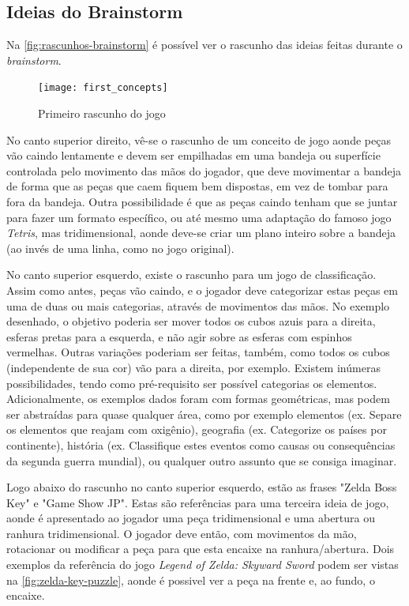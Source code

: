 \subsection{Ideias do Brainstorm}\label{subsec-ideias-brainstorm}

Na \autoref{fig:rascunhos-brainstorm} é possível ver o rascunho das ideias feitas durante o \textit{brainstorm}. 

\begin{figure}[h]
	\centering
	\caption{Primeiro rascunho do jogo}
	\texttt{[image: first\_concepts]}
	\legend{\fonteAP}
	\label{fig:rascunhos-brainstorm}
\end{figure}

No canto superior direito, vê-se o rascunho de um conceito de jogo aonde 
peças vão caindo lentamente e devem ser empilhadas em uma bandeja ou 
superfície controlada pelo movimento das mãos do jogador, que deve 
movimentar a bandeja de forma que as peças que caem fiquem bem dispostas, 
em vez de tombar para fora da bandeja. Outra possibilidade é que as 
peças caindo tenham que se juntar para fazer um formato específico, 
ou até mesmo uma adaptação do famoso jogo \textit{Tetris}, mas 
tridimensional, aonde deve-se criar um plano inteiro sobre a bandeja 
(ao invés de uma linha, como no jogo original).

No canto superior esquerdo, existe o rascunho para um jogo de classificação. Assim como antes, peças vão caindo, e o jogador deve categorizar estas peças em uma de duas ou mais categorias, através de movimentos das mãos. No exemplo desenhado, o objetivo poderia ser mover todos os cubos azuis para a direita, esferas pretas para a esquerda, e não agir sobre as esferas com espinhos vermelhas. Outras variações poderiam ser feitas, também, como todos os cubos (independente de sua cor) vão para a direita, por exemplo. Existem inúmeras possibilidades, tendo como pré-requisito ser possível categorias os elementos. Adicionalmente, os exemplos dados foram com formas geométricas, mas podem ser abstraídas para quase qualquer área, como por exemplo elementos (ex. Separe os elementos que reajam com oxigênio), geografia (ex. Categorize os países por continente), história (ex. Classifique estes eventos como causas ou consequências da segunda guerra mundial), ou qualquer outro assunto que se consiga imaginar.

Logo abaixo do rascunho no canto superior esquerdo, estão as frases "Zelda Boss Key" e "Game Show JP". Estas são referências para uma terceira ideia de jogo, aonde é apresentado ao jogador uma peça tridimensional e uma abertura ou ranhura tridimensional. O jogador deve então, com movimentos da mão, rotacionar ou modificar a peça para que esta encaixe na ranhura/abertura. Dois exemplos da referência do jogo \textit{Legend of Zelda: Skyward Sword} podem ser vistas na \autoref{fig:zelda-key-puzzle}, aonde é possivel ver a peça na frente e, ao fundo, o encaixe.


